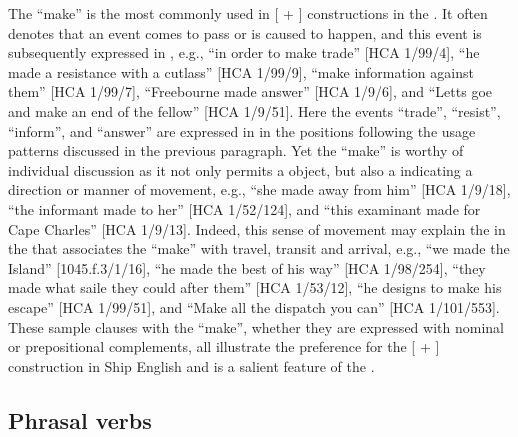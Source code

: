 The  “make” is the most commonly used  in [ + ] constructions in the . It often denotes that an event comes to pass or is caused to happen, and this event is subsequently expressed in  , e.g., “in order to make trade” [HCA 1/99/4], “he made a resistance with a cutlass” [HCA 1/99/9], “make information against them” [HCA 1/99/7], “Freebourne made answer” [HCA 1/9/6], and “Letts goe and make an end of the fellow” [HCA 1/9/51]. Here the events “trade”, “resist”, “inform”, and “answer” are expressed in  in the  positions following the usage patterns discussed in the previous paragraph. Yet the  “make” is worthy of individual discussion as it not only permits a  object, but also a  indicating a direction or manner of movement, e.g., “she made away from him” [HCA 1/9/18], “the informant made to her” [HCA 1/52/124], and “this examinant made for Cape Charles” [HCA 1/9/13]. Indeed, this sense of movement may explain the  in the  that associates the  “make” with travel, transit and arrival, e.g., “we made the Island” [1045.f.3/1/16], “he made the best of his way” [HCA 1/98/254], “they made what saile they could after them” [HCA 1/53/12], “he designs to make his escape” [HCA 1/99/51], and “Make all the dispatch you can” [HCA 1/101/553]. These sample clauses with the  “make”, whether they are expressed with nominal or prepositional complements, all illustrate the preference for the [ + ] construction in Ship English and is a salient feature of the . 

\subsection{{Phrasal verbs}}\label{sec:6.1.2}

